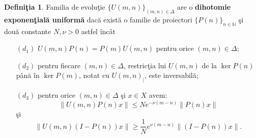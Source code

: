 \documentclass[ a4paper, 12pt]{report}
\newcommand{\N}{\mathbb{N}}
\newcommand{\defnemph}[1]{\textbf{#1}}
\theoremstyle{definition}
\newtheorem{definition}{\bf Defini\c tia}[section]
\theoremstyle{remark}
\numberwithin{equation}{section}
\begin{document}
\begin{definition}
\label{expdichot}
Familia de evolu\c tie $\{U(m,n)\}_{(m,n)\in\Delta}$ are o \defnemph{dihotomie exponen\c tial\u a uniform\u a} dac\u a
exist\u a o familie de proiectori $\{P(n)\}_{n\in\N}$ \c si dou\u a constante $N,\nu>0$ astfel \^inc\^at
\begin{enumerate}
\item[$(d_1)$] $U(m,n)P(n)=P(m)U(m,n)$ pentru orice $(m,n)\in\Delta$;
\item[$(d_2)$] pentru fiecare $(m,n)\in\Delta$, restric\c tia lui
    $U(m,n)$ de la $\ker P(n)$ p\^an\u a \^in $\ker P(m)$, notat cu
    $U(m,n)_{|}$, este inversabil\u a;
\item[$(d_3)$] pentru orice $(m,n)\in\Delta$ \c si $x\in X$ avem:  
$$\|U(m,n)P(n)x\|\leq Ne^{-\nu(m-n)}\|P(n)x\|$$ \c si $$\|U(m,n)(I-P(n))x\|\geq  \frac{1}{N}e^{\nu(m-n)}\|(I-P(n))x\|.$$ 
\end{enumerate}
\end{definition}
\end{document}
